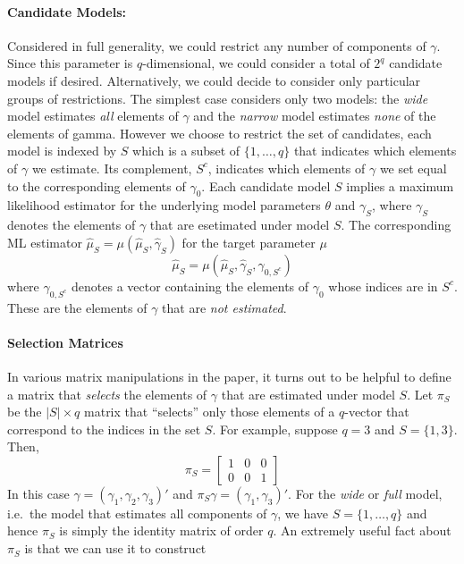\documentclass[12pt]{article}
\theoremstyle{definition}
\begin{document}
\paragraph{Candidate Models:} Considered in full generality, we could restrict any number of components of $\gamma$. Since this parameter is $q$-dimensional, we could consider a total of $2^q$ candidate models if desired. Alternatively, we could decide to consider only particular groups of restrictions. The simplest case considers only two models: the \emph{wide} model estimates \emph{all} elements of $\gamma$ and the \emph{narrow} model estimates \emph{none} of the elements of gamma. However we choose to restrict the set of candidates, each model is indexed by $S$ which is a subset of $\{1, \hdots, q\}$ that indicates which elements of $\gamma$ we estimate. Its complement, $S^c$, indicates which elements of $\gamma$ we set equal to the corresponding elements of $\gamma_0$. Each candidate model $S$ implies a maximum likelihood estimator
for the underlying model parameters $\theta$ and $\gamma_S$, where $\gamma_S$ denotes the elements of $\gamma$ that are esetimated under model $S$. The corresponding ML estimator $\widehat{\mu}_S = \mu\left(\widehat{\mu}_S, \widehat{\gamma}_S \right)$ for the target parameter $\mu$
	$$\widehat{\mu}_S = \mu\left(\widehat{\mu}_S, \widehat{\gamma}_S, \gamma_{0,S^c} \right)$$
where $\gamma_{0,S^c}$ denotes a vector containing the elements of $\gamma_0$ whose indices are in $S^c$. These are the elements of $\gamma$ that are \emph{not estimated}. 

\paragraph{Selection Matrices} In various matrix manipulations in the paper, it turns out to be helpful to define a matrix that \emph{selects} the elements of $\gamma$ that are estimated under model $S$. Let $\pi_S$ be the $|S|\times q$ matrix that ``selects'' only those elements of a $q$-vector that correspond to the indices in the set $S$. For example, suppose $q=3$ and $S = \{1,3\}$. Then,
	$$\pi_S = \left[\begin{array}
		{ccc} 1 & 0 & 0\\ 0 & 0 & 1
	\end{array} \right]$$
In this case $\gamma = (\gamma_1, \gamma_2, \gamma_3)'$ and $\pi_S \gamma = (\gamma_1, \gamma_3)'$. For the \emph{wide} or \emph{full} model, i.e.\ the model that estimates all components of $\gamma$, we have $S = \{1, \hdots, q\}$ and hence $\pi_S$ is simply the identity matrix of order $q$. An extremely useful fact about $\pi_S$ is that we can use it to construct 
\end{document}
